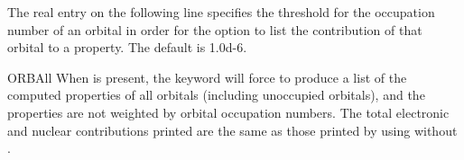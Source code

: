 \begin{keywordlist}
The real entry on the following line specifies the threshold for
the occupation number of an orbital in order for the
option to list the contribution of that orbital to a property.
The default is 1.0d-{}6.
\item[ORBAll]
When  is present, the keyword will force
 to produce a list of the computed properties
of all orbitals (including unoccupied orbitals), and the
properties are not weighted by orbital occupation numbers.
The total electronic and nuclear
contributions printed are the same as those printed by using
 without .
\end{keywordlist}


